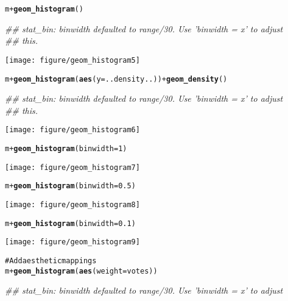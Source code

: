 \documentclass[a4paper,titlepage]{tufte-handout}\usepackage{graphicx, color}
\makeatletter
\def\maxwidth{ %
  \ifdim\Gin@nat@width>\linewidth
    \linewidth
  \else
    \Gin@nat@width
  \fi
}
\newcommand{\hlfunctioncall}[1]{\textcolor[rgb]{0.501960784313725,0,0.329411764705882}{\textbf{#1}}}%
\newcommand{\hlcomment}[1]{\textcolor[rgb]{0.180392156862745,0.6,0.341176470588235}{#1}}%
\newenvironment{kframe}{%
 \def\at@end@of@kframe{}%
 \ifinner\ifhmode%
  \def\at@end@of@kframe{\end{minipage}}%
  \begin{minipage}{\columnwidth}%
 \fi\fi%
 \def\FrameCommand##1{\hskip\@totalleftmargin \hskip-\fboxsep
 \colorbox{shadecolor}{##1}\hskip-\fboxsep
     \hskip-\linewidth \hskip-\@totalleftmargin \hskip\columnwidth}%
 \MakeFramed {\advance\hsize-\width
   \@totalleftmargin\z@ \linewidth\hsize
   \@setminipage}}%
 {\par\unskip\endMakeFramed%
 \at@end@of@kframe}
\newenvironment{knitrout}{}{} %
\makeatother
\begin{document}
\begin{knitrout}
\begin{kframe}
\begin{alltt}
m + \hlfunctioncall{geom_histogram}()
\end{alltt}
\begin{flushleft}\ttfamily\noindent\itshape\textcolor{messagecolor}{\#\# stat\_bin: binwidth defaulted to range/30. Use 'binwidth = x' to adjust \\ 
\#\# this.}\end{flushleft}\end{kframe}\texttt{[image: figure/geom\_histogram5]} \begin{kframe}\begin{alltt}
m + \hlfunctioncall{geom_histogram}(\hlfunctioncall{aes}(y = ..density..)) + \hlfunctioncall{geom_density}()
\end{alltt}
\begin{flushleft}\ttfamily\noindent\itshape\textcolor{messagecolor}{\#\# stat\_bin: binwidth defaulted to range/30. Use 'binwidth = x' to adjust \\ 
\#\# this.}\end{flushleft}\end{kframe}\texttt{[image: figure/geom\_histogram6]} \begin{kframe}\begin{alltt}
m + \hlfunctioncall{geom_histogram}(binwidth = 1)
\end{alltt}
\end{kframe}\texttt{[image: figure/geom\_histogram7]} \begin{kframe}\begin{alltt}
m + \hlfunctioncall{geom_histogram}(binwidth = 0.5)
\end{alltt}
\end{kframe}\texttt{[image: figure/geom\_histogram8]} \begin{kframe}\begin{alltt}
m + \hlfunctioncall{geom_histogram}(binwidth = 0.1)
\end{alltt}
\end{kframe}\texttt{[image: figure/geom\_histogram9]} \begin{kframe}\begin{alltt}
\hlcomment{# Add aesthetic mappings}
m + \hlfunctioncall{geom_histogram}(\hlfunctioncall{aes}(weight = votes))
\end{alltt}
\begin{flushleft}\ttfamily\noindent\itshape\textcolor{messagecolor}{\#\# stat\_bin: binwidth defaulted to range/30. Use 'binwidth = x' to adjust \\ 
}
\end{flushleft}
\end{kframe}
\end{knitrout}
\end{document}
